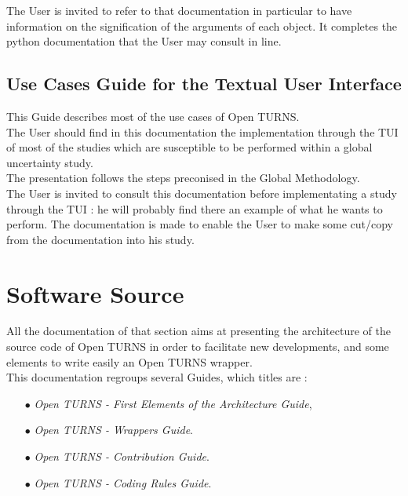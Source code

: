 \documentclass[11pt]{article}
\begin{document}
The User is invited to refer to that documentation in particular to have information on the signification of the arguments of each object. It completes the python documentation that the User may consult in line.

\subsection{ Use Cases Guide for the Textual User Interface}

This Guide describes most of the use cases of Open TURNS.\\

The User should find in this documentation the implementation through the TUI of most of the studies which are susceptible to be performed within a global uncertainty study.\\

The presentation follows the steps preconised in the Global Methodology.\\

The User is invited to consult this documentation before implementating a study through the TUI : he will probably find there an example of what he wants to perform. The documentation is made to enable the User to make some cut/copy from the documentation into his study.

\section{Software Source}

All the documentation of that section aims at presenting the architecture of the source code of Open TURNS in order to facilitate new developments, and some elements to write easily an Open TURNS wrapper.\\

This documentation regroups several Guides, which titles are :
\begin{itemize}
\item[$\bullet$] {\itshape Open TURNS - First Elements of the Architecture Guide},
\item[$\bullet$] {\itshape Open TURNS - Wrappers Guide}.
\item[$\bullet$] {\itshape Open TURNS - Contribution Guide}.
\item[$\bullet$] {\itshape Open TURNS - Coding Rules Guide}.
\end{itemize}
\end{document}
